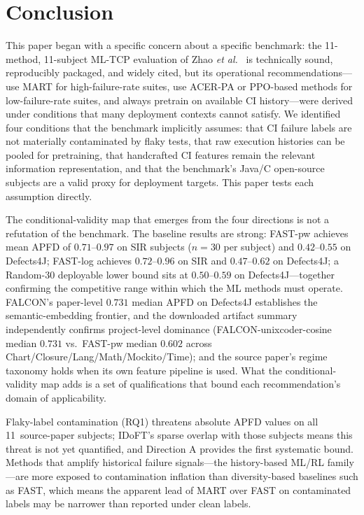 \documentclass[10pt,conference]{IEEEtran}
\begin{document}
\section{Conclusion}\label{sec:conclusion}

This paper began with a specific concern about a specific benchmark: the 11-method, 11-subject ML-TCP evaluation of Zhao \textit{et al.}~\cite{sourcepaper} is technically sound, reproducibly packaged, and widely cited, but its operational recommendations---use MART for high-failure-rate suites, use ACER-PA or PPO-based methods for low-failure-rate suites, and always pretrain on available CI history---were derived under conditions that many deployment contexts cannot satisfy. We identified four conditions that the benchmark implicitly assumes: that CI failure labels are not materially contaminated by flaky tests, that raw execution histories can be pooled for pretraining, that handcrafted CI features remain the relevant information representation, and that the benchmark's Java/C open-source subjects are a valid proxy for deployment targets. This paper tests each assumption directly.

The conditional-validity map that emerges from the four directions is not a refutation of the benchmark. The baseline results are strong: FAST-pw achieves mean APFD of $0.71$--$0.97$ on SIR subjects ($n = 30$ per subject) and $0.42$--$0.55$ on Defects4J; FAST-log achieves $0.72$--$0.96$ on SIR and $0.47$--$0.62$ on Defects4J; a Random-30 deployable lower bound sits at $0.50$--$0.59$ on Defects4J---together confirming the competitive range within which the ML methods must operate. FALCON's paper-level $0.731$ median APFD on Defects4J establishes the semantic-embedding frontier, and the downloaded artifact summary independently confirms project-level dominance (FALCON-unixcoder-cosine median $0.731$ vs.\ FAST-pw median $0.602$ across Chart/Closure/Lang/Math/Mockito/Time); and the source paper's regime taxonomy holds when its own feature pipeline is used. What the conditional-validity map adds is a set of qualifications that bound each recommendation's domain of applicability.

Flaky-label contamination (RQ1) threatens absolute APFD values on all 11~source-paper subjects; IDoFT's sparse overlap with those subjects means this threat is not yet quantified, and Direction A provides the first systematic bound. Methods that amplify historical failure signals---the history-based ML/RL family---are more exposed to contamination inflation than diversity-based baselines such as FAST, which means the apparent lead of MART over FAST on contaminated labels may be narrower than reported under clean labels.
\end{document}
